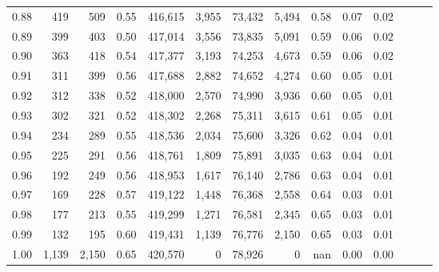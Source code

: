 \begin{tabular}{rrrrrrrrrrrrrr}
0.88 &     419 &    509 &  0.55 &  416,615 &    3,955 &  73,432 &   5,494 &  0.58 &  0.07 &      0.02 \\
0.89 &     399 &    403 &  0.50 &  417,014 &    3,556 &  73,835 &   5,091 &  0.59 &  0.06 &      0.02 \\
0.90 &     363 &    418 &  0.54 &  417,377 &    3,193 &  74,253 &   4,673 &  0.59 &  0.06 &      0.02 \\
0.91 &     311 &    399 &  0.56 &  417,688 &    2,882 &  74,652 &   4,274 &  0.60 &  0.05 &      0.01 \\
0.92 &     312 &    338 &  0.52 &  418,000 &    2,570 &  74,990 &   3,936 &  0.60 &  0.05 &      0.01 \\
0.93 &     302 &    321 &  0.52 &  418,302 &    2,268 &  75,311 &   3,615 &  0.61 &  0.05 &      0.01 \\
0.94 &     234 &    289 &  0.55 &  418,536 &    2,034 &  75,600 &   3,326 &  0.62 &  0.04 &      0.01 \\
0.95 &     225 &    291 &  0.56 &  418,761 &    1,809 &  75,891 &   3,035 &  0.63 &  0.04 &      0.01 \\
0.96 &     192 &    249 &  0.56 &  418,953 &    1,617 &  76,140 &   2,786 &  0.63 &  0.04 &      0.01 \\
0.97 &     169 &    228 &  0.57 &  419,122 &    1,448 &  76,368 &   2,558 &  0.64 &  0.03 &      0.01 \\
0.98 &     177 &    213 &  0.55 &  419,299 &    1,271 &  76,581 &   2,345 &  0.65 &  0.03 &      0.01 \\
0.99 &     132 &    195 &  0.60 &  419,431 &    1,139 &  76,776 &   2,150 &  0.65 &  0.03 &      0.01 \\
1.00 &   1,139 &  2,150 &  0.65 &  420,570 &        0 &  78,926 &       0 &   nan &  0.00 &      0.00 \\
\bottomrule
\end{tabular}

